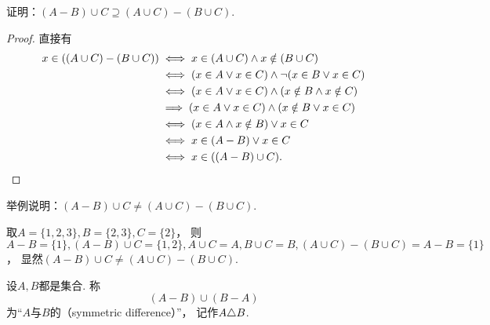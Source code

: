 \begin{example}
证明：\((A - B) \cup C \supseteq (A \cup C) - (B \cup C)\).
\begin{proof}
直接有\begin{align*}
	x \in ((A \cup C) - (B \cup C))
	&\iff
	x \in (A \cup C)
	\land
	x \notin (B \cup C) \\
	&\iff
	(
		x \in A
		\lor
		x \in C
	)
	\land
	\neg(
		x \in B
		\lor
		x \in C
	) \\
	&\iff
	(
		x \in A
		\lor
		x \in C
	)
	\land
	(
		x \notin B
		\land
		x \notin C
	) \\
	&\implies
	(
		x \in A
		\lor
		x \in C
	)
	\land
	(
		x \notin B
		\lor
		x \in C
	) \\
	&\iff
	(
		x \in A
		\land
		x \notin B
	)
	\lor
	x \in C \\
	&\iff
	x \in (A - B)
	\lor
	x \in C \\
	&\iff
	x \in ((A - B) \cup C).
	\qedhere
\end{align*}
\end{proof}
\end{example}

\begin{example}
举例说明：\((A - B) \cup C \neq (A \cup C) - (B \cup C)\).
\begin{solution}
取\(A = \{1,2,3\},
B = \{2,3\},
C = \{2\}\)，
则\(A - B = \{1\},
(A - B) \cup C = \{1,2\},
A \cup C = A,				\allowbreak
B \cup C = B,
(A \cup C) - (B \cup C)
= A - B = \{1\}\)，
显然\((A - B) \cup C \neq (A \cup C) - (B \cup C)\).
\end{solution}
\end{example}

\begin{definition}
设\(A,B\)都是集合.
称\begin{equation*}
	(A-B)\cup(B-A)
\end{equation*}为“\(A\)与\(B\)的（symmetric difference）”，
记作\(A \triangle B\).
\end{definition}

